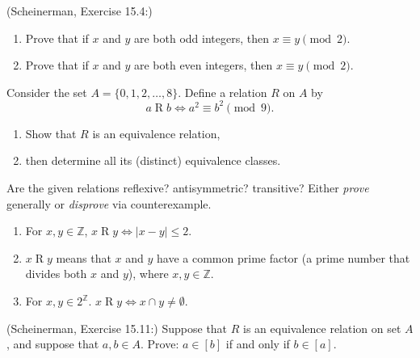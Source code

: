 \documentclass{article}
\newcommand{\Z}{\mathbb{Z}}
\theoremstyle{definition}
\begin{document}
\begin{question}
    (Scheinerman, Exercise 15.4:)
    \begin{enumerate}
        \item Prove that if $x$ and $y$ are both odd integers, then $x \equiv y \pmod{2}$.
        \item Prove that if $x$ and $y$ are both even integers, then $x \equiv y \pmod{2}$.
    \end{enumerate}
\end{question}
\begin{solution}
\end{solution}


\begin{question}
    Consider the set $A = \{0, 1, 2, \dots, 8 \}$. Define a relation $R$ on $A$ by
	\[
	a\mathrel{R}b \iff a^2 \equiv b^2 \pmod{9}.
	\]
	\begin{enumerate}
	\item Show that $R$ is an equivalence relation, 
	\item then determine all its (distinct) equivalence classes.
	\end{enumerate}
\end{question}
\begin{solution}
\end{solution}


\begin{question}
    Are the given relations reflexive? antisymmetric? transitive? Either \textit{prove} generally or \textit{disprove} via 
    counterexample.
    	\begin{enumerate}
	\item For $x, y \in \Z$,  $x\mathrel{R}y \iff |x - y| \leq 2$. 
	\item  $x\mathrel{R}y$ means that $x$ and $y$ have a common prime factor (a prime number that divides both $x$ and $y$), 
	where $x, y \in \Z$.
	\item For $x, y \in 2^{\Z}$. $x\mathrel{R}y \iff x \cap y \neq \emptyset$.
	\end{enumerate}
\end{question}
\begin{solution}
\end{solution}


\begin{question}
    (Scheinerman, Exercise 15.11:)
    Suppose that $R$ is an equivalence relation on  set $A$, and suppose that $a, b \in A$.
    Prove: $a \in [b]$ if and only if $b \in [a]$.
\end{question}
\begin{solution}
\end{solution}
\end{document}
